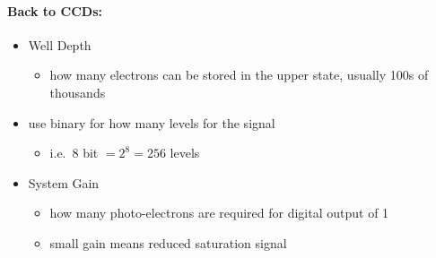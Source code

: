 \documentclass[a4paper,11pt,normalem]{article}
\begin{document}
\paragraph{Back to CCDs:}
\begin{itemize}
    \item Well Depth
        \begin{itemize}
            \item how many electrons can be stored in the upper state, usually 100s of thousands
        \end{itemize}
    \item use binary for how many levels for the signal
        \begin{itemize}
            \item i.e.~8 bit \(= 2^8 = 256\) levels
        \end{itemize}
    \item System Gain
        \begin{itemize}
            \item how many photo-electrons are required for digital output of 1
            \item small gain means reduced saturation signal
        \end{itemize}
\end{itemize}
\end{document}
